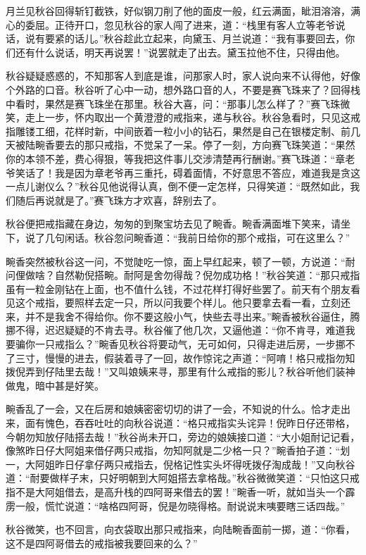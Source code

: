 \documentclass[12pt,UTF8]{ctexbook}
\begin{document}
{{{月兰见秋谷回得斩钉截铁，好似钢刀削了他的面皮一般，红云满面，眦泪溶溶，满心的委屈。正待开口，忽见秋谷的家人闯了进来，道：“栈里有客人立等老爷说话，说有要紧的话儿。”秋谷趁此立起来，向黛玉、月兰说道：“我有事要回去，你们还有什么说话，明天再说罢！”说罢就走了出去。黛玉拉他不住，只得由他。

秋谷疑疑惑惑的，不知那客人到底是谁，问那家人时，家人说向来不认得他，好像个外路的口音。秋谷听了心中一动，想外路口音的人，不要是赛飞珠来了？回得栈中看时，果然是赛飞珠坐在那里。秋谷大喜，问：“那事儿怎么样了？”赛飞珠微笑，走上一步，怀内取出一个黄澄澄的戒指来，递与秋谷。秋谷急看时，只见这戒指雕镂工细，花样时新，中间嵌着一粒小小的钻石，果然是自己在银楼定制、前几天被陆畹香要去的那只戒指，不觉呆了一呆。停了一刻，方向赛飞珠笑道：“果然你的本领不差，费心得狠，等我把这件事儿交涉清楚再行酬谢。”赛飞珠道：“章老爷笑话了！我是因为章老爷再三重托，碍着面情，不好意思不答应，难道我是贪这一点儿谢仪么？”秋谷见他说得认真，倒不便一定怎样，只得笑道：“既然如此，我们随后再说就是了。”赛飞珠方才欢喜，辞别去了。

秋谷便把戒指藏在身边，匆匆的到聚宝坊去见了畹香。畹香满面堆下笑来，请坐下，说了几句闲话。秋谷忽问畹香道：“我前日给你的那个戒指，可在这里么？”

畹香突然被秋谷这一问，不觉陡吃一惊，面上早红起来，顿了一顿，方说道：“耐问俚做啥？自然勒倪搭畹。耐阿是舍勿得哉？倪勿成功格！”秋谷笑道：“那只戒指虽有一粒金刚钻在上面，也不值什么钱，不过花样打得好些罢了。前天有个朋友看见这个戒指，要照样去定一只，所以问我要个样儿。他只要拿去看一看，立刻还来，并不是我舍不得给你。你不要这般小气，快些去寻出来。”畹香被秋谷逼住，腾挪不得，迟迟疑疑的不肯去寻。秋谷催了他几次，又逼他道：“你不肯寻，难道我要骗你一只戒指么？”畹香见秋谷将要动气，无可如何，只得走进后房，一步挪不了三寸，慢慢的进去，假装着寻了一回，故作惊诧之声道：“阿唷！格只戒指勿知拨倪弄到仔陆里去哉！”又叫娘姨来寻，那里有什么戒指的影儿？秋谷听他们装神做鬼，暗中甚是好笑。

畹香乱了一会，又在后房和娘姨密密切切的讲了一会，不知说的什么。恰才走出来，面有愧色，吞吞吐吐的向秋谷说道：“格只戒指实头诧异！倪昨日仔还带格，今朝勿知放仔陆搭去哉！”秋谷尚未开口，旁边的娘姨接口道：“大小姐耐记记看，像煞昨日仔大阿姐来借仔两只戒指，勿知阿就是二少格一只？”畹香拍子道：“划一，大阿姐昨日仔拿仔两只戒指去，倪格记性实头坏得呒拨仔淘成哉！”又向秋谷道：“耐要做样子末，只好明朝到大阿姐搭去拿格哉。”秋谷微微笑道：“只怕这只戒指不是大阿姐借去，是高升栈的四阿哥来借去的罢！”畹香一听，就如当头一个霹雳一般，慌忙说道：“啥格四阿哥，倪是勿晓得格。耐说说末咦要瞎三话四哉。”

秋谷微笑，也不回言，向衣袋取出那只戒指来，向陆畹香面前一掷，道：“你看，这不是四阿哥借去的戒指被我要回来的么？”

}}}
\end{document}
